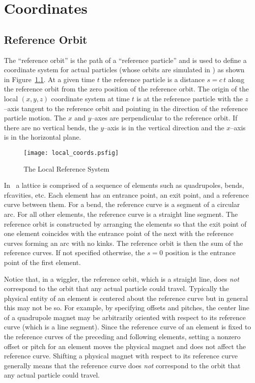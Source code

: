 \chapter{Coordinates}

\section{Reference Orbit}
\label{s:ref}

The ``reference orbit'' is the path of a ``reference particle'' and is
used to define a coordinate system for actual particles (whose orbits
are simulated in \bmad) as shown in Figure~\ref{f:local_coords}. At a
given time $t$ the reference particle is a distance $s = c \, t$ along
the reference orbit from the zero position of the reference orbit. The
origin of the local $(x, y, z)$ coordinate system at time $t$ is at the
reference particle with the $z$--axis tangent to the reference
orbit and pointing in the direction of the reference particle
motion. The $x$ and $y$--axes are perpendicular to the reference
orbit. If there are no vertical bends, the $y$--axis is in the
vertical direction and the $x$--axis is in the horizontal plane.

\begin{figure}[tb]
\centering
\texttt{[image: local\_coords.psfig]}
\caption{The Local Reference System}
\label{f:local_coords}
\end{figure}

In \bmad\, a lattice is comprised of a sequence of elements such as
quadrupoles, bends, rfcavities, etc. Each element has an entrance
point, an exit point, and a reference curve between them. For a bend,
the reference curve is a segment of a circular arc. For all other
elements, the reference curve is a straight line segment.  The
reference orbit is constructed by arranging the elements so that the
exit point of one element coincides with the entrance point of the
next with the reference curves forming an arc with no kinks.
The reference orbit is then the sum of the reference curves. If
not specified otherwise, the $s = 0$ position is the entrance
point of the first element.

Notice that, in a wiggler, the reference orbit, which is a straight
line, does {\em not} correspond to the orbit that any actual particle
could travel. Typically the physical entity of an element is centered
about the reference curve but in general this may not be so. For
example, by specifying offsets and pitches, the center line of a
quadrupole magnet may be arbitrarily oriented with respect to its
reference curve (which is a line segment). Since the reference curve
of an element is fixed to the reference curves of the preceding and
following elements, setting a nonzero offset or pitch for an element
moves the physical magnet and does not affect the reference
curve. Shifting a physical magnet with respect to its reference curve
generally means that the reference curve does {\em not} correspond to
the orbit that any actual particle could travel.

